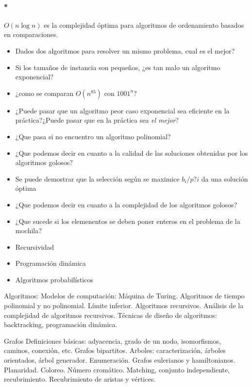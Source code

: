 \paragraph{*} \(O(n\log{n})\) es la complejidad óptima para algoritmos de ordenamiento basados en comparaciones. 
\color{red}
\begin{itemize}
	\item Dados dos algoritmos para resolver un mismo problema, cual es el mejor?
	\item Si los tamaños de instancia son pequeños, ¿es tan malo un algoritmo exponencial?
	\item ¿como se comparan \(O(n^85)\) con \(1001^n\)?
	\item ¿Puede pasar que un algoritmo peor caso exponencial sea eficiente en la práctica?¿Puede pasar que en la práctica sea \textit{el mejor}?
	\item ¿Que pasa si no encuentro un algoritmo polinomial?
	\item ¿Que podemos decir en cuanto a la calidad de las soluciones obtenidas por los algoritmos golosos?
	\item Se puede demostrar que la selección según se maximice \(b_i/p?i\) da una solución óptima
	\item ¿Que podemos decir en cuanto a la complejidad de los algoritmos golosos?
	\item ¿Que sucede si los elemenentos se deben poner enteros en el problema de la mochila?
	\item Recursividad
	\item Programación dinámica
	\item Algoritmos probabilísticos
\end{itemize}
Algoritmos: Modelos de computación: Máquina de Turing. Algoritmos de tiempo polinomial y no polinomial. Límite inferior. Algoritmos recursivos. Análisis de la complejidad de algoritmos recursivos. Técnicas de diseño de algoritmos: backtracking, programación dinámica.


Grafos Definiciones básicas: adyacencia, grado de un nodo, isomorfismos, caminos, conexión, etc. Grafos bipartitos. Arboles: caracterización, árboles orientados, árbol generador. Enumeración. Grafos eulerianos y hamiltonianos. Planaridad. Coloreo. Número cromático. Matching, conjunto independiente, recubrimiento. Recubrimiento de aristas y vértices.



